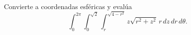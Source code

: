 Convierte a coordenadas esféricas y evalúa
\[
\int_0^{2\pi}\int_0^{\sqrt2}\int_r^{\sqrt{4-r^2}}
z\sqrt{r^2+z^2}\,r\,dz\,dr\,d\theta.
\]
